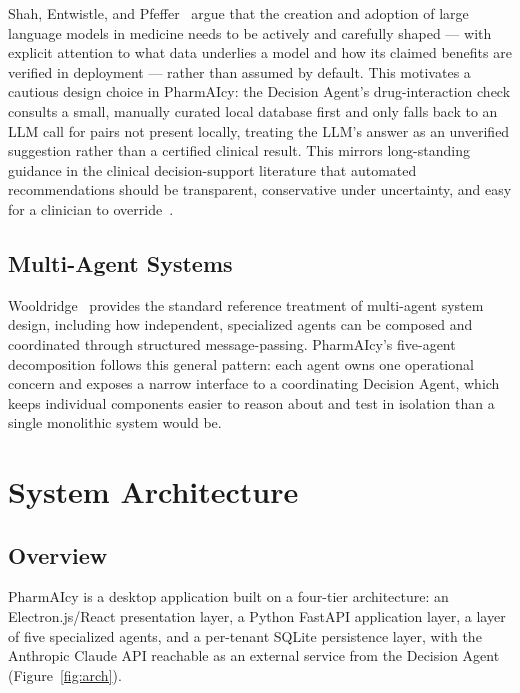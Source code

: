 \documentclass[12pt,a4paper]{article}
\begin{document}
Shah, Entwistle, and Pfeffer~\cite{shah2023} argue that the creation and adoption of large language models in medicine needs to be actively and carefully shaped --- with explicit attention to what data underlies a model and how its claimed benefits are verified in deployment --- rather than assumed by default. This motivates a cautious design choice in PharmAIcy: the Decision Agent's drug-interaction check consults a small, manually curated local database first and only falls back to an LLM call for pairs not present locally, treating the LLM's answer as an unverified suggestion rather than a certified clinical result. This mirrors long-standing guidance in the clinical decision-support literature that automated recommendations should be transparent, conservative under uncertainty, and easy for a clinician to override~\cite{bates2003}.

\subsection{Multi-Agent Systems}

Wooldridge~\cite{wooldridge2009} provides the standard reference treatment of multi-agent system design, including how independent, specialized agents can be composed and coordinated through structured message-passing. PharmAIcy's five-agent decomposition follows this general pattern: each agent owns one operational concern and exposes a narrow interface to a coordinating Decision Agent, which keeps individual components easier to reason about and test in isolation than a single monolithic system would be.

\section{System Architecture}
\label{sec:architecture}

\subsection{Overview}

PharmAIcy is a desktop application built on a four-tier architecture: an Electron.js/React presentation layer, a Python FastAPI application layer, a layer of five specialized agents, and a per-tenant SQLite persistence layer, with the Anthropic Claude API reachable as an external service from the Decision Agent (Figure~\ref{fig:arch}).
\end{document}
